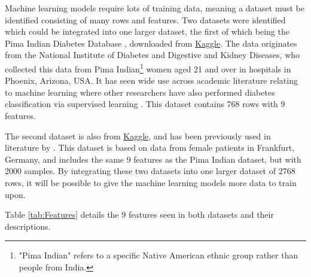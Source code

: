 \documentclass[12pt]{report}
\newcommand{\para}{\vspace{8pt}\noindent}
\begin{document}
Machine learning models require lots of training data, meaning a dataset must be identified consisting of many 
rows and features. Two datasets were identified which could be integrated into one larger dataset, the first of which being 
the Pima Indian Diabetes Database \autocite{uci_machine_learning_pima_nodate}, downloaded from \href{https://www.kaggle.com/datasets/uciml/pima-indians-diabetes-database}{Kaggle}.
The data originates from the National Institute of Diabetes and Digestive and Kidney Diseases, who collected this data from Pima Indian\footnote{"Pima Indian" refers to a specific Native American ethnic group rather than people from India.}
women aged 21 and over in hospitals in Phoenix, Arizona, USA. It has seen wide use across academic literature relating to machine learning 
where other researchers have also performed diabetes classification via supervised learning \autocite{alzubi_diabetes_2023,zou_construction_2024,joshi_predicting_2021,hayashi_rule_2016}.
This dataset contains 768 rows with 9 features.

\para
The second dataset is also from \href{https://www.kaggle.com/datasets/johndasilva/diabetes/data}{Kaggle}, and has been previously used in literature by 
\textcite{zou_construction_2024}. This dataset \autocite{john_dasilva_frankfurt_nodate} is based on data from female patients in Frankfurt, Germany, and
includes the same 9 features as the Pima Indian dataset, but with 2000 samples. By integrating these two datasets into one larger
dataset of 2768 rows, it will be possible to give the machine learning models more data to train upon.

\para Table \ref{tab:Features} details the 9 features seen in both datasets and their descriptions.
\end{document}

